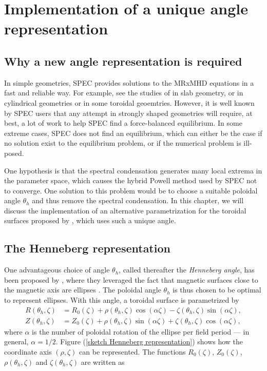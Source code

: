 \documentclass[my_thesis.tex]{subfiles}
\begin{document}
\section{Implementation of a unique angle representation \label{sec. angle representation}}

\subsection{Why a new angle representation is required}
In simple geometries, SPEC provides solutions to the MRxMHD equations in a fast and reliable way. For example, see the studies of \citet{Qu2021,Loizu2020} in slab geometry, or \citet{Kumar2021} in cylindrical geometries or \citet{Kumar2022} in some toroidal geoemtries. However, it is well known by SPEC users that any attempt in strongly shaped geometries will require, at best, a lot of work to help SPEC find a force-balanced equilibrium. In some extreme cases, SPEC does not find an equilibrium, which can either be the case if no solution exist to the equilibrium problem, or if the numerical problem is ill-posed. 


One hypothesis is that the spectral condensation generates many local extrema in the parameter space, which causes the hybrid Powell method used by SPEC not to converge. One solution to this problem would be to choose a suitable poloidal angle $\theta_h$ and thus remove the spectral condensation. In this chapter, we will discuss the implementation of an alternative parametrization for the toroidal surfaces proposed by \citep{Henneberg2021}, which uses such a unique angle. 

\subsection{The Henneberg representation}
One advantageous choice of angle $\theta_h$, called thereafter the \emph{Henneberg angle}, has been proposed by \citet{Henneberg2021}, where they leveraged the fact that magnetic surfaces close to the magnetic axis are ellipses \citep{Helander2014}. The poloidal angle $\theta_h$ is thus chosen to be optimal to represent ellipses. With this angle, a toroidal surface is parametrized by
\begin{eqnarray}
	R(\theta_h,\zeta) &= R_0(\zeta) + \rho(\theta_h,\zeta)\cos(\alpha \zeta) - \zeta(\theta_h,\zeta)\sin(\alpha \zeta), \label{eq.Rfctrhophi}\\
	Z(\theta_h,\zeta) &= Z_0(\zeta) + \rho(\theta_h,\zeta)\sin(\alpha \zeta) + \zeta(\theta_h,\zeta)\cos(\alpha \zeta),\label{eq.Zfctrhophi}
\end{eqnarray}
where $\alpha$ is the number of poloidal rotation of the ellipse per field period --- in general, $\alpha=1/2$. Figure (\ref{sketch Henneberg representation}) shows how the coordinate axis $(\rho,\zeta)$ can be represented. The functions $R_0(\zeta)$, $Z_0(\zeta)$, $\rho(\theta_h,\zeta)$ and $\zeta(\theta_h,\zeta)$ are written as
\end{document}
